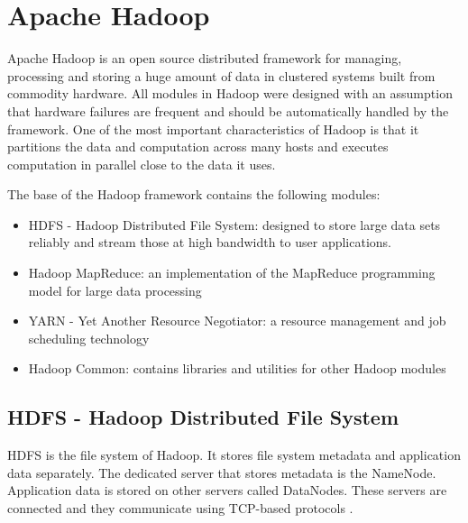 \chapter{Apache Hadoop}
Apache Hadoop is an open source distributed framework for managing, processing and storing a huge amount of data in clustered systems built from commodity hardware. All modules in Hadoop were designed with an assumption that hardware failures are frequent and should be automatically handled by the framework. One of the most important characteristics of Hadoop is that it partitions the data and computation across many hosts and executes computation in parallel close to the data it uses.  \cite{Hadoop-wiki}

\noindent The base of the Hadoop framework contains the following modules:
\begin{itemize}
	\item HDFS - Hadoop Distributed File System: designed to store large data sets reliably and stream those at high bandwidth to user applications.
	\item Hadoop MapReduce: an implementation of the MapReduce programming model for large data processing
	\item YARN - Yet Another Resource Negotiator: a resource management and job scheduling technology
	\item Hadoop Common: contains libraries and utilities for other Hadoop modules
\end{itemize}

\section{HDFS - Hadoop Distributed File System}
HDFS is the file system of Hadoop. It stores file system metadata and application data separately. The dedicated server that stores metadata is the NameNode. Application data is stored on other servers called DataNodes. These servers are connected and they communicate using TCP-based protocols \cite{Shvachko:2010:HDF:1913798.1914427}. 

